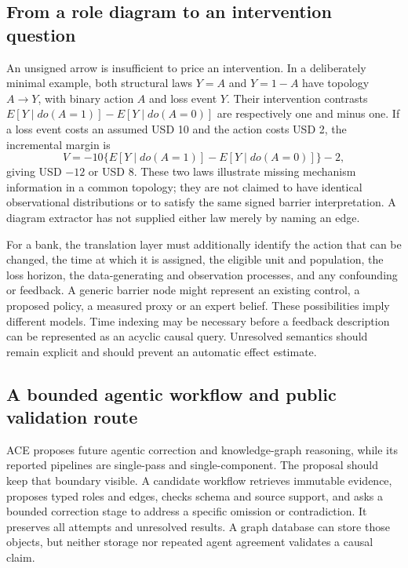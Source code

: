 \subsection{From a role diagram to an intervention question}
\label{exec21:ace-intervention}
An unsigned arrow is insufficient to price an intervention. In a deliberately minimal example, both structural laws $Y=A$ and $Y=1-A$ have topology $A\to Y$, with binary action $A$ and loss event $Y$. Their intervention contrasts $E[Y\mid do(A=1)]-E[Y\mid do(A=0)]$ are respectively one and minus one. If a loss event costs an assumed USD 10 and the action costs USD 2, the incremental margin is
\begin{equation}
 V=-10\{E[Y\mid do(A=1)]-E[Y\mid do(A=0)]\}-2,
 \label{exec21:ace-value}
\end{equation}
giving USD $-12$ or USD 8. These two laws illustrate missing mechanism information in a common topology; they are not claimed to have identical observational distributions or to satisfy the same signed barrier interpretation. A diagram extractor has not supplied either law merely by naming an edge.~\citep{exec21_ace_reference}

For a bank, the translation layer must additionally identify the action that can be changed, the time at which it is assigned, the eligible unit and population, the loss horizon, the data-generating and observation processes, and any confounding or feedback. A generic barrier node might represent an existing control, a proposed policy, a measured proxy or an expert belief. These possibilities imply different models. Time indexing may be necessary before a feedback description can be represented as an acyclic causal query. Unresolved semantics should remain explicit and should prevent an automatic effect estimate.

\subsection{A bounded agentic workflow and public validation route}
\label{exec21:ace-integration}
ACE proposes future agentic correction and knowledge-graph reasoning, while its reported pipelines are single-pass and single-component. The proposal should keep that boundary visible. A candidate workflow retrieves immutable evidence, proposes typed roles and edges, checks schema and source support, and asks a bounded correction stage to address a specific omission or contradiction. It preserves all attempts and unresolved results. A graph database can store those objects, but neither storage nor repeated agent agreement validates a causal claim.~\citep{exec21_ace}

